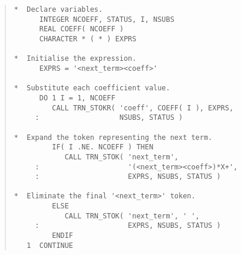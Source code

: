 \documentclass[twoside,11pt]{article}
\newcommand{\numcir}[1]{\mbox{\hspace{3ex}\fbox{#1}}}
\begin{document}
\begin{quote}
\begin{tabbing} %

\verb#*  Declare variables.                                  #\\
\verb#      INTEGER NCOEFF, STATUS, I, NSUBS                 #\\
\verb#      REAL COEFF( NCOEFF )                             #\\
\verb#      CHARACTER * ( * ) EXPRS                          #\\
\verb#                                                       #\\
\verb#*  Initialise the expression.                          #\\
\verb#      EXPRS = '<next_term><coeff>'                     #\numcir{1}\\
\verb#                                                       #\\
\verb#*  Substitute each coefficient value.                  #\\
\verb#      DO 1 I = 1, NCOEFF                               #\\
\verb#         CALL TRN_STOKR( 'coeff', COEFF( I ), EXPRS,   #\numcir{2}\\
\verb#     :                   NSUBS, STATUS )               #\\
\verb#                                                       #\\
\verb#*  Expand the token representing the next term.        #\\
\verb#         IF( I .NE. NCOEFF ) THEN                      #\\
\verb#            CALL TRN_STOK( 'next_term',                #\numcir{3}\\
\verb#     :                     '(<next_term><coeff>)*X+',  #\\
\verb#     :                     EXPRS, NSUBS, STATUS )      #\\
\verb#                                                       #\\
\verb#*  Eliminate the final '<next_term>' token.            #\\
\verb#         ELSE                                          #\\
\verb#            CALL TRN_STOK( 'next_term', ' ',           #\numcir{4}\\
\verb#     :                     EXPRS, NSUBS, STATUS )      #\\
\verb#         ENDIF                                         #\\
\verb#   1  CONTINUE                                         #\\

\end{tabbing}
\end{quote}
\end{document}
